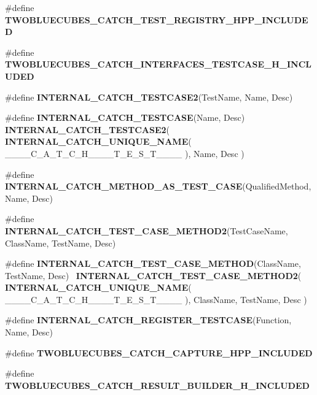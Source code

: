 \begin{DoxyCompactItemize}
\item 
\#define \textbf{ T\+W\+O\+B\+L\+U\+E\+C\+U\+B\+E\+S\+\_\+\+C\+A\+T\+C\+H\+\_\+\+T\+E\+S\+T\+\_\+\+R\+E\+G\+I\+S\+T\+R\+Y\+\_\+\+H\+P\+P\+\_\+\+I\+N\+C\+L\+U\+D\+ED}
\item 
\#define \textbf{ T\+W\+O\+B\+L\+U\+E\+C\+U\+B\+E\+S\+\_\+\+C\+A\+T\+C\+H\+\_\+\+I\+N\+T\+E\+R\+F\+A\+C\+E\+S\+\_\+\+T\+E\+S\+T\+C\+A\+S\+E\+\_\+\+H\+\_\+\+I\+N\+C\+L\+U\+D\+ED}
\item 
\#define \textbf{ I\+N\+T\+E\+R\+N\+A\+L\+\_\+\+C\+A\+T\+C\+H\+\_\+\+T\+E\+S\+T\+C\+A\+S\+E2}(Test\+Name,  Name,  Desc)
\item 
\#define \textbf{ I\+N\+T\+E\+R\+N\+A\+L\+\_\+\+C\+A\+T\+C\+H\+\_\+\+T\+E\+S\+T\+C\+A\+SE}(Name,  Desc)~\textbf{ I\+N\+T\+E\+R\+N\+A\+L\+\_\+\+C\+A\+T\+C\+H\+\_\+\+T\+E\+S\+T\+C\+A\+S\+E2}( \textbf{ I\+N\+T\+E\+R\+N\+A\+L\+\_\+\+C\+A\+T\+C\+H\+\_\+\+U\+N\+I\+Q\+U\+E\+\_\+\+N\+A\+ME}( \+\_\+\+\_\+\+\_\+\+\_\+\+C\+\_\+\+A\+\_\+\+T\+\_\+\+C\+\_\+\+H\+\_\+\+\_\+\+\_\+\+\_\+\+T\+\_\+\+E\+\_\+\+S\+\_\+\+T\+\_\+\+\_\+\+\_\+\+\_\+ ), Name, Desc )
\item 
\#define \textbf{ I\+N\+T\+E\+R\+N\+A\+L\+\_\+\+C\+A\+T\+C\+H\+\_\+\+M\+E\+T\+H\+O\+D\+\_\+\+A\+S\+\_\+\+T\+E\+S\+T\+\_\+\+C\+A\+SE}(Qualified\+Method,  Name,  Desc)
\item 
\#define \textbf{ I\+N\+T\+E\+R\+N\+A\+L\+\_\+\+C\+A\+T\+C\+H\+\_\+\+T\+E\+S\+T\+\_\+\+C\+A\+S\+E\+\_\+\+M\+E\+T\+H\+O\+D2}(Test\+Case\+Name,  Class\+Name,  Test\+Name,  Desc)
\item 
\#define \textbf{ I\+N\+T\+E\+R\+N\+A\+L\+\_\+\+C\+A\+T\+C\+H\+\_\+\+T\+E\+S\+T\+\_\+\+C\+A\+S\+E\+\_\+\+M\+E\+T\+H\+OD}(Class\+Name,  Test\+Name,  Desc)~\textbf{ I\+N\+T\+E\+R\+N\+A\+L\+\_\+\+C\+A\+T\+C\+H\+\_\+\+T\+E\+S\+T\+\_\+\+C\+A\+S\+E\+\_\+\+M\+E\+T\+H\+O\+D2}( \textbf{ I\+N\+T\+E\+R\+N\+A\+L\+\_\+\+C\+A\+T\+C\+H\+\_\+\+U\+N\+I\+Q\+U\+E\+\_\+\+N\+A\+ME}( \+\_\+\+\_\+\+\_\+\+\_\+\+C\+\_\+\+A\+\_\+\+T\+\_\+\+C\+\_\+\+H\+\_\+\+\_\+\+\_\+\+\_\+\+T\+\_\+\+E\+\_\+\+S\+\_\+\+T\+\_\+\+\_\+\+\_\+\+\_\+ ), Class\+Name, Test\+Name, Desc )
\item 
\#define \textbf{ I\+N\+T\+E\+R\+N\+A\+L\+\_\+\+C\+A\+T\+C\+H\+\_\+\+R\+E\+G\+I\+S\+T\+E\+R\+\_\+\+T\+E\+S\+T\+C\+A\+SE}(Function,  Name,  Desc)
\item 
\#define \textbf{ T\+W\+O\+B\+L\+U\+E\+C\+U\+B\+E\+S\+\_\+\+C\+A\+T\+C\+H\+\_\+\+C\+A\+P\+T\+U\+R\+E\+\_\+\+H\+P\+P\+\_\+\+I\+N\+C\+L\+U\+D\+ED}
\item 
\#define \textbf{ T\+W\+O\+B\+L\+U\+E\+C\+U\+B\+E\+S\+\_\+\+C\+A\+T\+C\+H\+\_\+\+R\+E\+S\+U\+L\+T\+\_\+\+B\+U\+I\+L\+D\+E\+R\+\_\+\+H\+\_\+\+I\+N\+C\+L\+U\+D\+ED}

\end{DoxyCompactItemize}
